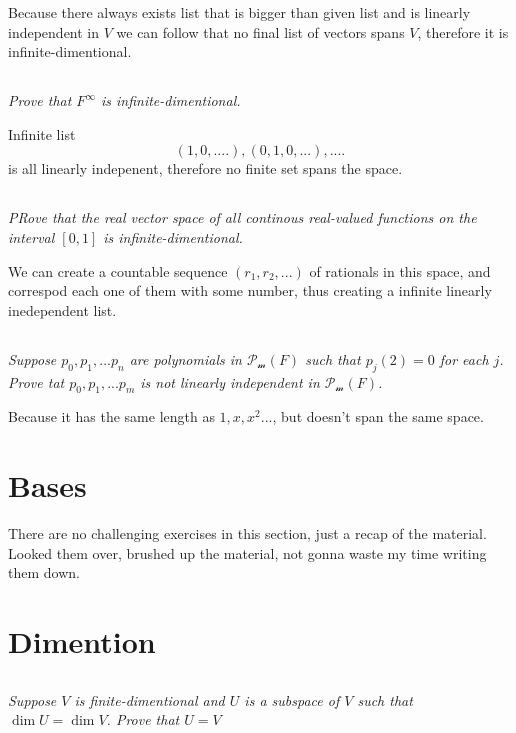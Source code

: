 \documentclass[11pt,oneside,titlepage]{book}
\begin{document}
Because there always exists list that is bigger than
given list and is linearly independent in $V$ we can follow that
no final list of vectors spans $V$, therefore it is infinite-dimentional.


\subsection{}
\textit{Prove that $F^{\infty}$ is infinite-dimentional.}

Infinite list
$$(1, 0, ....), (0, 1, 0, ...), .... $$
is all linearly indepenent, therefore no finite set spans the space.


\subsection{}
\textit{PRove that the real vector space of all continous real-valued
  functions on the interval $[0, 1]$ is infinite-dimentional.}

We can create a countable sequence $(r_1, r_2, ... )$ of rationals in this
space, and correspod each one of them with some number, thus creating a
infinite linearly inedependent list.

\subsection{}

\textit{Suppose $p_0, p_1, ... p_n$ are
  polynomials in $\mathcal{P_m}(F)$ such that
  $p_j(2) = 0$ for each $j$. Prove tat $p_0, p_1, ... p_m$ is not linearly
  independent in $\mathcal{P_m}(F)$.}

Because it has the same length as $1, x, x^2 ... $, but doesn't span the same
space.

\section{Bases}

There are no challenging exercises in this section, just a recap of
the material. Looked them over, brushed up the material, not gonna waste
my time writing them down.

\section{Dimention}

\subsection{}
\textit{Suppose $V$ is finite-dimentional and $U$ is a subspace of $V$ such
  that $\dim U = \dim V$. Prove that $U = V$}
\end{document}
